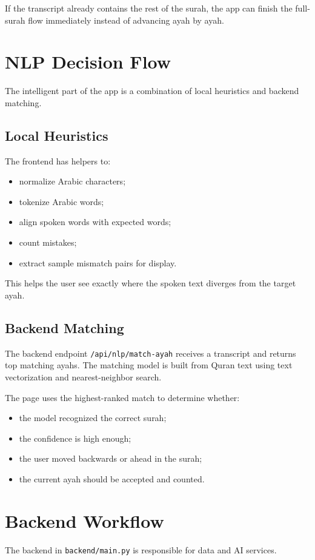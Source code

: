 \documentclass[11pt,a4paper]{article}
\begin{document}
If the transcript already contains the rest of the surah, the app can finish the full-surah flow immediately instead of advancing ayah by ayah.

\section{NLP Decision Flow}
The intelligent part of the app is a combination of local heuristics and backend matching.

\subsection{Local Heuristics}
The frontend has helpers to:
\begin{itemize}
  \item normalize Arabic characters;
  \item tokenize Arabic words;
  \item align spoken words with expected words;
  \item count mistakes;
  \item extract sample mismatch pairs for display.
\end{itemize}

This helps the user see exactly where the spoken text diverges from the target ayah.

\subsection{Backend Matching}
The backend endpoint \texttt{/api/nlp/match-ayah} receives a transcript and returns top matching ayahs. The matching model is built from Quran text using text vectorization and nearest-neighbor search.

The page uses the highest-ranked match to determine whether:
\begin{itemize}
  \item the model recognized the correct surah;
  \item the confidence is high enough;
  \item the user moved backwards or ahead in the surah;
  \item the current ayah should be accepted and counted.
\end{itemize}

\section{Backend Workflow}
The backend in \texttt{backend/main.py} is responsible for data and AI services.
\end{document}
